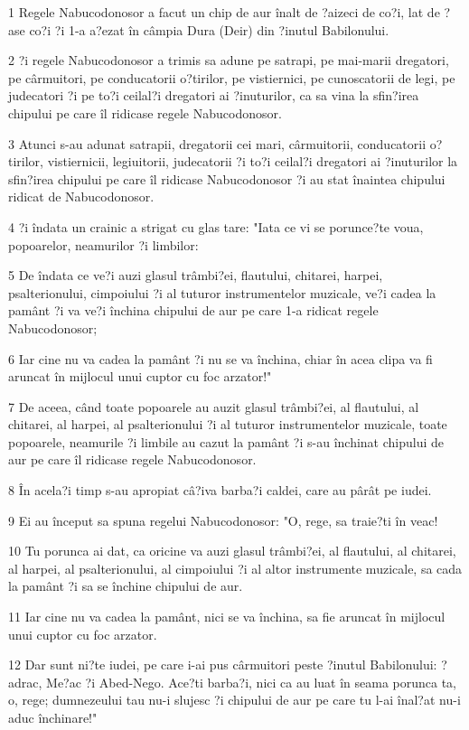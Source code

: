 \par 1 Regele Nabucodonosor a facut un chip de aur înalt de ?aizeci de co?i, lat de ?ase co?i ?i 1-a a?ezat în câmpia Dura (Deir) din ?inutul Babilonului.
\par 2 ?i regele Nabucodonosor a trimis sa adune pe satrapi, pe mai-marii dregatori, pe cârmuitori, pe conducatorii o?tirilor, pe vistiernici, pe cunoscatorii de legi, pe judecatori ?i pe to?i ceilal?i dregatori ai ?inuturilor, ca sa vina la sfin?irea chipului pe care îl ridicase regele Nabucodonosor.
\par 3 Atunci s-au adunat satrapii, dregatorii cei mari, cârmuitorii, conducatorii o?tirilor, vistiernicii, legiuitorii, judecatorii ?i to?i ceilal?i dregatori ai ?inuturilor la sfin?irea chipului pe care îl ridicase Nabucodonosor ?i au stat înaintea chipului ridicat de Nabucodonosor.
\par 4 ?i îndata un crainic a strigat cu glas tare: "Iata ce vi se porunce?te voua, popoarelor, neamurilor ?i limbilor:
\par 5 De îndata ce ve?i auzi glasul trâmbi?ei, flautului, chitarei, harpei, psalterionului, cimpoiului ?i al tuturor instrumentelor muzicale, ve?i cadea la pamânt ?i va ve?i închina chipului de aur pe care 1-a ridicat regele Nabucodonosor;
\par 6 Iar cine nu va cadea la pamânt ?i nu se va închina, chiar în acea clipa va fi aruncat în mijlocul unui cuptor cu foc arzator!"
\par 7 De aceea, când toate popoarele au auzit glasul trâmbi?ei, al flautului, al chitarei, al harpei, al psalterionului ?i al tuturor instrumentelor muzicale, toate popoarele, neamurile ?i limbile au cazut la pamânt ?i s-au închinat chipului de aur pe care îl ridicase regele Nabucodonosor.
\par 8 În acela?i timp s-au apropiat câ?iva barba?i caldei, care au pârât pe iudei.
\par 9 Ei au început sa spuna regelui Nabucodonosor: "O, rege, sa traie?ti în veac!
\par 10 Tu porunca ai dat, ca oricine va auzi glasul trâmbi?ei, al flautului, al chitarei, al harpei, al psalterionului, al cimpoiului ?i al altor instrumente muzicale, sa cada la pamânt ?i sa se închine chipului de aur.
\par 11 Iar cine nu va cadea la pamânt, nici se va închina, sa fie aruncat în mijlocul unui cuptor cu foc arzator.
\par 12 Dar sunt ni?te iudei, pe care i-ai pus cârmuitori peste ?inutul Babilonului: ?adrac, Me?ac ?i Abed-Nego. Ace?ti barba?i, nici ca au luat în seama porunca ta, o, rege; dumnezeului tau nu-i slujesc ?i chipului de aur pe care tu l-ai înal?at nu-i aduc închinare!"
